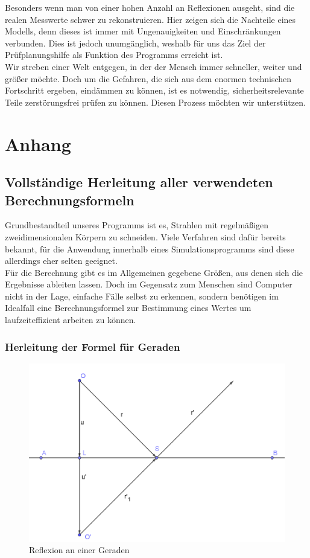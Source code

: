 \documentclass[reducespace,stylepage,semiarbeit]{spezidoc}
\begin{document}
Besonders wenn man von einer hohen Anzahl an Reflexionen ausgeht, sind die realen Messwerte schwer zu rekonstruieren.
Hier zeigen sich die Nachteile eines Modells, denn dieses ist immer mit Ungenauigkeiten und Einschränkungen verbunden.
Dies ist jedoch unumgänglich, weshalb für uns das Ziel der Prüfplanungshilfe als Funktion des Programms erreicht ist.\\ %
Wir streben einer Welt entgegen, in der der Mensch immer schneller, weiter und größer möchte. 
Doch um die Gefahren, die sich aus dem enormen technischen Fortschritt ergeben, eindämmen zu können, ist es notwendig, sicherheitsrelevante Teile zerstörungsfrei prüfen zu können. 
Diesen Prozess möchten wir unterstützen.\\ %


\newpage
\section{Anhang}

\subsection{Vollständige Herleitung aller verwendeten Berechnungsformeln} \label{sec:AnhangHerlFormel}
Grundbestandteil unseres Programms ist es, Strahlen mit regelmäßigen zweidimensionalen Körpern zu schneiden. Viele Verfahren sind dafür bereits bekannt, für die Anwendung innerhalb eines Simulationsprogramms sind diese allerdings eher selten geeignet.\\
Für die Berechnung gibt es im Allgemeinen gegebene Größen, aus denen sich die Ergebnisse ableiten lassen. Doch im Gegensatz zum Menschen sind Computer nicht in der Lage, einfache Fälle selbst zu erkennen, sondern benötigen im Idealfall eine Berechnungsformel zur Bestimmung eines Wertes um laufzeiteffizient arbeiten zu können.

\subsubsection*{Herleitung der Formel für Geraden}

\begin{figure}[h]
\centering
\includegraphics[scale=0.5]{pictures/LineRef.png}
\caption{Reflexion an einer Geraden}
\end{figure}
\end{document}
